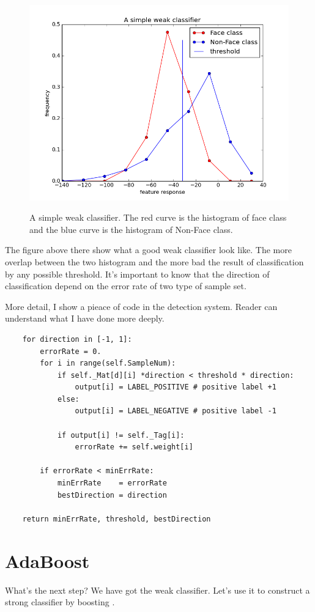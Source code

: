 \documentclass[a4paper, 11pt]{article} %
\begin{document}
    \begin{figure}[H]
        \centering
        \includegraphics[width = 0.7\linewidth]{../figure/simpleClassifier.png}
        \label{fig:simpleWeakClassifier}
        \caption{A simple weak classifier. The red curve is the histogram of face class and the blue curve is the histogram of Non-Face class.}
    \end{figure}

    The figure above there show what a good weak classifier look like. The more overlap between the two histogram and the more bad the result of classification by any possible threshold. It's important to know that the direction of classification depend on the error rate of two type of sample set.

    More detail, I show a pieace of code in the detection system. Reader can understand what I have done more deeply.

    \begin{verbatim}
    for direction in [-1, 1]:
        errorRate = 0.
        for i in range(self.SampleNum):
            if self._Mat[d][i] *direction < threshold * direction:
                output[i] = LABEL_POSITIVE # positive label +1
            else:
                output[i] = LABEL_NEGATIVE # positive label -1

            if output[i] != self._Tag[i]:
                errorRate += self.weight[i]

        if errorRate < minErrRate:
            minErrRate    = errorRate
            bestDirection = direction

    return minErrRate, threshold, bestDirection
    \end{verbatim}

\clearpage
\section{AdaBoost}
What's the next step? We have got the weak classifier. Let's use it to construct a strong classifier by boosting \cite{BIASVARIANCEANDARCINGCLASSIFIERS}.
\end{document}
